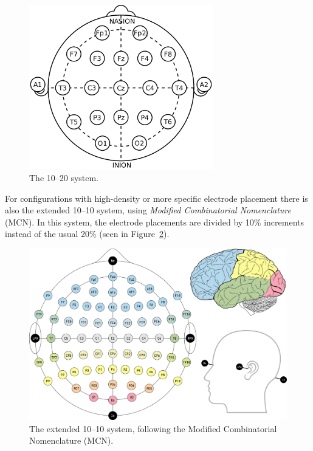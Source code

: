     \begin{figure}[h]
        \begin{center}
            \includegraphics[width=8cm]{img/1020system.png}
        \end{center}
        \caption{The 10–20 system.}\label{fig:1020}
    \end{figure}

    For configurations with high-density or more specific electrode placement there is also the extended 10--10 system, using \emph{Modified Combinatorial Nomenclature} (MCN). In this system, the electrode placements are divided by 10\% increments instead of the usual 20\% (seen in Figure~\ref{fig:1010}).

    \begin{landscape}
        \begin{figure}
            \begin{center}
                \includegraphics[width=20cm]{img/1020system-extended-with-extra-info.png}
            \end{center}
            \caption{The extended 10–10 system, following the Modified Combinatorial Nomenclature (MCN).}\label{fig:1010}
        \end{figure}
    \end{landscape}

